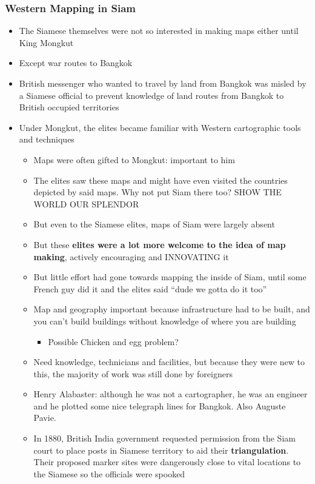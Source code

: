\documentclass[a4paper]{article}
\begin{document}
\subsubsection{Western Mapping in Siam}
\begin{itemize}
	\item The Siamese themselves were not so interested in making maps either until King Mongkut
	\item Except war routes to Bangkok
	\item British messenger who wanted to travel by land from Bangkok was misled by a Siamese official to prevent knowledge of land routes from Bangkok to British occupied territories
	\item Under Mongkut, the elites became familiar with Western cartographic tools and techniques
	\begin{itemize}[label=$\circ$]
		\item Maps were often gifted to Mongkut: important to him
		\item The elites saw these maps and might have even visited the countries depicted by said maps. Why not put Siam there too? SHOW THE WORLD OUR SPLENDOR
		\item But even to the Siamese elites, maps of Siam were largely absent
		\item But these \textbf{elites were a lot more welcome to the idea of map making}, actively encouraging and INNOVATING it
		\item But little effort had gone towards mapping the inside of Siam, until some French guy did it and the elites said ``dude we gotta do it too''
		\item Map and geography important because infrastructure had to be built, and you can’t build buildings without knowledge of where you are building
		\begin{itemize}[label=\tiny$\blacksquare$]
			\item Possible Chicken and egg problem?
		\end{itemize}
		\item Need knowledge, technicians and facilities, but because they were new to this, the majority of work was still done by foreigners
		\item Henry Alabaster: although he was not a cartographer, he was an engineer and he plotted some nice telegraph lines for Bangkok. Also Auguste Pavie.
		\item In 1880, British India government requested permission from the Siam court to place posts in Siamese territory to aid their \textbf{triangulation}. Their proposed marker sites were dangerously close to vital locations to the Siamese so the officials were spooked

\end{itemize}
\end{itemize}
\end{document}

